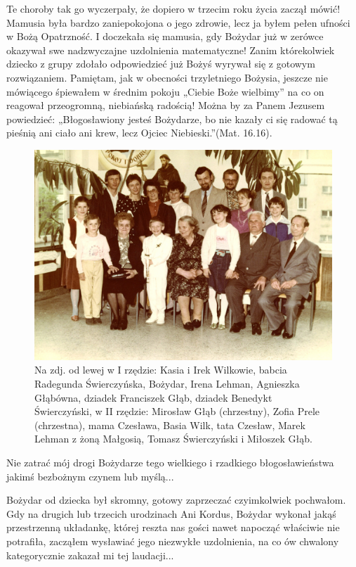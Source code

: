 Te choroby tak go wyczerpały, że dopiero w trzecim roku życia zaczął mówić! Mamusia była bardzo zaniepokojona o jego zdrowie, lecz ja byłem pełen ufności w Bożą Opatrzność. I doczekała się mamusia, gdy Bożydar już w zerówce okazywał swe nadzwyczajne uzdolnienia matematyczne! Zanim którekolwiek dziecko z grupy zdołało odpowiedzieć już Bożyś wyrywał się z gotowym rozwiązaniem. Pamiętam, jak w obecności trzyletniego Bożysia, jeszcze nie mówiącego śpiewałem w średnim pokoju „Ciebie Boże wielbimy” na co on reagował przeogromną, niebiańską radością! Można by za Panem Jezusem powiedzieć: „Błogosławiony jesteś Bożydarze, bo nie kazały ci się radować tą pieśnią ani ciało ani krew, lecz Ojciec Niebieski.”(Mat. 16.16).
\begin{figure}[!h]
\begin{center}
\includegraphics[width=\textwidth]{photo/bozydar_swierczynski_komunia_2.jpg}
\caption[I Komunia św. Bożydara -- zdjęcie zbiorowe]{Na zdj. od lewej w I rzędzie: Kasia i Irek Wilkowie, babcia Radegunda Świerczyńska, Bożydar, Irena Lehman, Agnieszka Głąbówna, dziadek Franciszek Głąb, dziadek Benedykt Świerczyński, w II rzędzie: Mirosław Głąb (chrzestny), Zofia Prele (chrzestna), mama Czesława, Basia Wilk, tata Czesław, Marek Lehman z żoną Małgosią, Tomasz Świerczyński i Miłoszek Głąb.}
\end{center}
\end{figure}

Nie zatrać mój drogi Bożydarze tego wielkiego i rzadkiego błogosławieństwa jakimś bezbożnym czynem lub myślą...

Bożydar od dziecka był skromny, gotowy zaprzeczać czyimkolwiek pochwałom. Gdy na drugich lub trzecich urodzinach Ani Kordus, Bożydar wykonał jakąś przestrzenną układankę, której reszta nas gości nawet napocząć właściwie nie potrafiła, zacząłem wysławiać jego niezwykłe uzdolnienia, na co ów chwalony kategorycznie zakazał mi tej laudacji...

